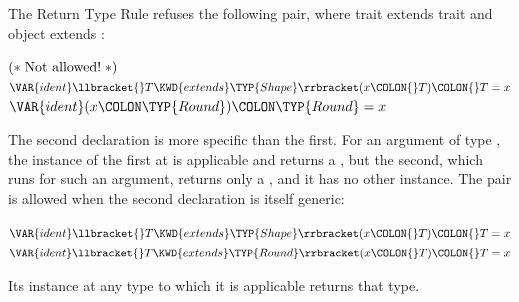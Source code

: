 The Return Type Rule refuses the following pair, where trait 
extends trait  and object  extends :
\begin{Fortress}
\(\mathtt{(*}\;\hbox{\rm  Not allowed! \unskip}\;\mathtt{*)}\)\\
\(\VAR{ident}\llbracket{}T \KWD{extends} \TYP{Shape}\rrbracket(x\COLON{}T)\COLON{}T = x\)\\
\(\VAR{ident}(x\COLON \TYP{Round})\COLON \TYP{Round} = x\)
\end{Fortress}
The second declaration is more specific than the first.
For an argument of type , the instance of the first at 
is applicable and returns a , but the second, which runs for such an
argument, returns only a , and it has no other instance.
The pair is allowed when the second declaration is itself generic:
\begin{Fortress}
\(\VAR{ident}\llbracket{}T \KWD{extends} \TYP{Shape}\rrbracket(x\COLON{}T)\COLON{}T = x\)\\
\(\VAR{ident}\llbracket{}T \KWD{extends} \TYP{Round}\rrbracket(x\COLON{}T)\COLON{}T = x\)
\end{Fortress}
Its instance at any type to which it is applicable returns that type.
